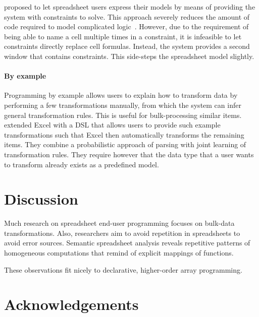 \documentclass[a4paper]{article}
\begin{document}
\citet{Stadelmann:1993:SBC:168642.168664} proposed to let spreadsheet
users express their models by means of providing the system with
constraints to solve. This approach severely reduces the amount of
code required to model complicated
logic~\cite{Stadelmann:1993:SBC:168642.168664}. However, due to the
requirement of being able to name a cell multiple times in a
constraint, it is infeasible to let constraints directly replace cell
formulas. Instead, the system provides a second window that contains
constraints. This side-steps the spreadsheet model slightly.

\paragraph{By example}

Programming by example allows users to explain how to transform data
by performing a few transformations manually, from which the system
can infer general transformation rules. This is useful for
bulk-processing similar items. \citet{Singh:2016:TSD:2837614.2837668}
extended Excel with a DSL that allows users to provide such example
transformations such that Excel then automatically transforms the
remaining items. They combine a probabilistic approach of parsing with
joint learning of transformation rules. They require however that the
data type that a user wants to transform already exists as a
predefined model.

\section{Discussion}
\label{sec:discussion}

Much research on spreadsheet end-user programming focuses on bulk-data
transformations. Also, researchers aim to avoid repetition in
spreadsheets to avoid error sources. Semantic spreadsheet analysis
reveals repetitive patterns of homogeneous computations that remind of
explicit mappings of functions.

These observations fit nicely to declarative, higher-order array
programming. 

\section*{Acknowledgements}




\end{document}
